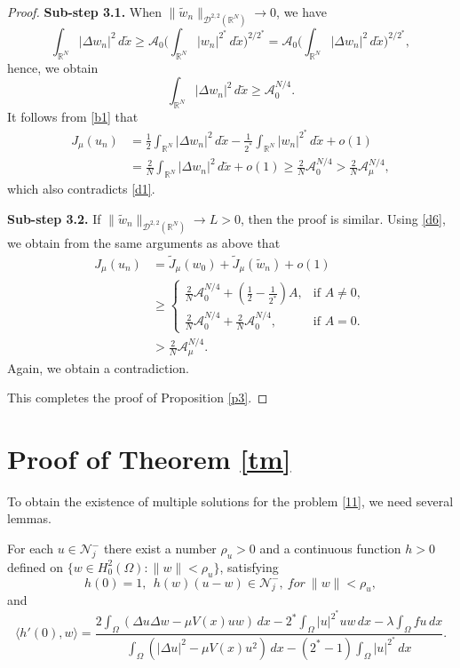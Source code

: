 \documentclass[reqno]{amsart}
\begin{document}
\begin{proof}
\noindent\textbf{Sub-step 3.1.} 
When \(\|\tilde{w}_n\|_{ \mathcal{D}^{2,2}(\mathbb{R}^N)}\to 0\), we have
\[
 \int_{\mathbb{R}^N}|\Delta {w}_n|^2\,d\tilde{x}
 \geq \mathcal{A}_{0}\Big( \int _{\mathbb{R}^N}|{w}_n|^{2^*}\,d\tilde{x}\Big) ^{2/2^*}
 =\mathcal{A}_{0}\Big( \int_{\mathbb{R}^N}|\Delta {w}_n|^2\,d\tilde{x}\Big) ^{2/2^*},
\]
hence, we obtain
\[
 \int_{\mathbb{R}^N}|\Delta {w}_n|^2\,d\tilde{x}\geq \mathcal{A}_{0}^{N/4}.
\]
It follows from \eqref{b1} that
\begin{align*}
 J_\mu(u_n)
 &=\frac{1}{2}\int_{\mathbb{R}^N}|\Delta {w}_n|^2\,d\tilde{x}-\frac{1}{2^*}
 \int _{\mathbb{R}^N}|{w}_n|^{2^*}\,d\tilde{x}+o(1)\\
 &=\frac{2}{N}\int_{\mathbb{R}^N}|\Delta {w}_n|^2\,d\tilde{x}+o(1)\geq \frac{2}{N}\mathcal{A}_{0}^{N/4}> \frac{2}{N}\mathcal{A}_{\mu}^{N/4},
\end{align*}
which also contradicts \eqref{d1}.
\smallskip

\noindent\textbf{Sub-step 3.2.} 
If \(\|\tilde{w}_n\|_{ \mathcal{D}^{2,2}(\mathbb{R}^N)}\to L>0\), then the proof 
is similar. Using \eqref{d6}, we obtain from the same arguments as above that
 \begin{align*}
 J_\mu(u_n)
 &=\tilde{J}_\mu(w_0)+\tilde{J}_\mu( \tilde{w}_n)+o(1) \\
 &\geq  \begin{cases}
 \frac{2}{N}\mathcal{A}_{0}^{N/4}+ \left( \frac{1}{2}-\frac{1}{2^*}\right) A, 
  &\text{if } A\neq 0, \\
 \frac{2}{N}\mathcal{A}_{0}^{N/4}+\frac{2}{N}\mathcal{A}_{0}^{N/4},  
 &\text{if } A=0.
 \end{cases}
 \\
 &>\frac{2}{N}\mathcal{A}_{\mu}^{N/4}.
 \end{align*}
 Again, we obtain a contradiction.
 
 This completes the proof of Proposition \ref{p3}.
 \end{proof}
 
 \section{Proof of Theorem \ref{tm}}
 To obtain the existence of multiple solutions for the problem \eqref{11},
we need several lemmas.

 \begin{lemma}
For each \(u\in \mathcal{N}^-_j\) there exist a number \(\rho_u>0\) and a 
continuous function \(h>0\) defined on \(\{w \in H^2_0(\Omega): \|w\|<\rho_u \}\), 
satisfying 
\[
 h(0)=1, \ \ h(w)(u-w)\in \mathcal{N}^-_j , \ for \ \|w\|<\rho_u,
\]
and
\[
 \langle h'(0),w\rangle=\frac{2\int_{\Omega} \left( \Delta u\Delta w-\mu V(x)uw\right)\,dx -2^*\int_{\Omega} |u|^{2^*}uw\,dx-\lambda \int_{\Omega} fu\,dx}{\int_{\Omega} \left( |\Delta u|^2-\mu V(x)u^2\right)\,dx -(2^*-1)\int_{\Omega} |u|^{2^*}\,dx}.
\]
\end{lemma}
\end{document}

